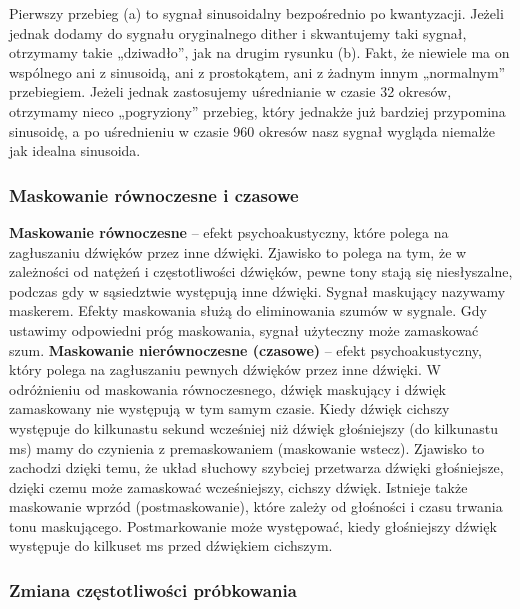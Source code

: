 \documentclass[a4paper,titleauthor]{mwart}
\begin{document}
Pierwszy przebieg (a) to sygnał sinusoidalny bezpośrednio po kwantyzacji. Jeżeli jednak dodamy do sygnału oryginalnego dither i skwantujemy taki sygnał, otrzymamy takie „dziwadło”, jak na drugim rysunku (b). \newline \newline
Fakt, że niewiele ma on wspólnego ani z sinusoidą, ani z prostokątem, ani z żadnym innym „normalnym” przebiegiem. Jeżeli jednak zastosujemy uśrednianie w czasie 32 okresów, otrzymamy nieco „pogryziony” przebieg, który jednakże już bardziej przypomina sinusoidę, a po uśrednieniu w czasie 960 okresów nasz sygnał wygląda niemalże jak idealna sinusoida.   


\subsubsection{Maskowanie równoczesne i czasowe}

\textbf{Maskowanie równoczesne} – efekt psychoakustyczny, które polega na zagłuszaniu dźwięków przez inne dźwięki. Zjawisko to polega na tym, że w zależności od natężeń i częstotliwości dźwięków, pewne tony stają się niesłyszalne, podczas gdy w sąsiedztwie występują inne dźwięki. Sygnał maskujący nazywamy maskerem. \newline \newline
 Efekty maskowania służą do eliminowania szumów w sygnale. Gdy ustawimy odpowiedni próg maskowania, sygnał użyteczny może zamaskować szum.
\newline \newline
\textbf{Maskowanie nierównoczesne (czasowe)} – efekt psychoakustyczny, który polega na zagłuszaniu pewnych dźwięków przez inne dźwięki. \newline \newline
W odróżnieniu od maskowania równoczesnego, dźwięk maskujący i dźwięk zamaskowany nie występują w tym samym czasie. Kiedy dźwięk cichszy występuje do kilkunastu sekund wcześniej niż dźwięk głośniejszy (do kilkunastu ms) mamy do czynienia z premaskowaniem (maskowanie wstecz). Zjawisko to zachodzi dzięki temu, że układ słuchowy szybciej przetwarza dźwięki głośniejsze, dzięki czemu może zamaskować wcześniejszy, cichszy dźwięk. Istnieje także maskowanie wprzód (postmaskowanie), które zależy od głośności i czasu trwania tonu maskującego. Postmarkowanie może występować, kiedy głośniejszy dźwięk występuje do kilkuset ms przed dźwiękiem cichszym.

\subsubsection{Zmiana częstotliwości próbkowania}
\end{document}
